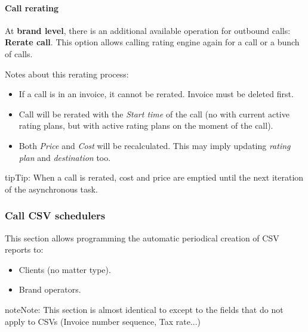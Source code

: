 \documentclass[letterpaper,10pt,english]{sphinxmanual}
\begin{document}
\paragraph{Call rerating}
\label{administration_portal/client/vpbx/calls/external_calls:call-rerating}
At \textbf{brand level}, there is an additional available operation for outbound calls: \textbf{Rerate call}. This option allows calling rating engine again for a call or a bunch of calls.

Notes about this rerating process:
\begin{itemize}
\item {} 
If a call is in an invoice, it cannot be rerated. Invoice must be deleted first.

\item {} 
Call will be rerated with the \emph{Start time} of the call (no with current active rating plans, but with active rating plans
on the moment of the call).

\item {} 
Both \emph{Price} and \emph{Cost} will be recalculated. This may imply updating \emph{rating plan} and \emph{destination} too.

\end{itemize}

\begin{notice}{tip}{Tip:}
When a call is rerated, cost and price are emptied until the next iteration of the asynchronous task.
\end{notice}


\subsubsection{Call CSV schedulers}
\label{administration_portal/client/vpbx/calls/call_csv_schedulers:call-csv-schedulers}\label{administration_portal/client/vpbx/calls/call_csv_schedulers::doc}
This section allows programming the automatic periodical creation of CSV reports to:
\begin{itemize}
\item {} 
Clients (no matter type).

\item {} 
Brand operators.

\end{itemize}

\begin{notice}{note}{Note:}
This section is almost identical to {\hyperref[administration_portal/brand/invoicing/invoice_schedulers:invoice\string-schedulers]{}} except to the
fields that do not apply to CSVs (Invoice number sequence, Tax rate...)
\end{notice}
\end{document}
